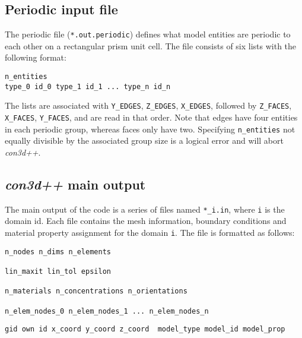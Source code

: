 \documentclass[]{article}
\def\con{\emph{con3d++}}
\def\gap{\vspace*{5mm}}
\begin{document}
\subsection{Periodic input file}\label{sec:format:per}
The periodic file (\verb=*.out.periodic=) defines what model entities
are periodic to each other on a rectangular prism unit cell. The file consists of six lists with the following format:
\begin{center}
  \begin{minipage}{0.9\textwidth}
\begin{lstlisting}
n_entities
type_0 id_0 type_1 id_1 ... type_n id_n
\end{lstlisting}
  \end{minipage}
\end{center}
The lists are associated with \verb=Y_EDGES=, \verb=Z_EDGES=,
\verb=X_EDGES=, followed by \verb=Z_FACES=, \verb=X_FACES=,
\verb=Y_FACES=, and are read in that order. Note that edges have four
entities in each periodic group, whereas faces only have
two. Specifying \verb=n_entities= not equally divisible by the
associated group size is a logical error and will abort \con{}.

\subsection{\con{} main output}\label{sec:format:out}
The main output of the code is a series of files named \verb=*_i.in=,
where \verb=i= is the domain id. Each file contains the mesh
information, boundary conditions and material property assignment for
the domain \verb=i=. The file is formatted as follows:
\gap
{}
\begin{center}
  \begin{minipage}{0.9\textwidth}
\begin{lstlisting}
n_nodes n_dims n_elements

lin_maxit lin_tol epsilon

n_materials n_concentrations n_orientations

n_elem_nodes_0 n_elem_nodes_1 ... n_elem_nodes_n
\end{lstlisting}
  \end{minipage}
\end{center}

\gap
{}
\begin{center}
  \begin{minipage}{0.9\textwidth}
\begin{lstlisting}
gid own id x_coord y_coord z_coord  model_type model_id model_prop
\end{lstlisting}
  \end{minipage}
\end{center}
\end{document}
